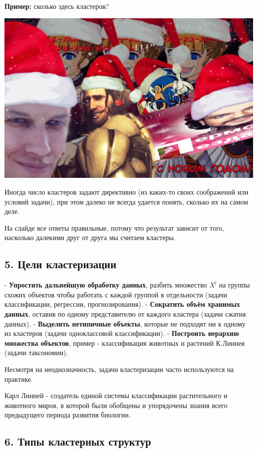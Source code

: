 \textbf{Пример:} сколько здесь кластеров?

\includegraphics[scale=0.3]{figures/samplefigure.jpg}

Иногда число кластеров задают директивно (из каких-то своих соображений
или условий задачи), при этом далеко не всегда удается понять, сколько
их на самом деле.

На слайде все ответы правильные, потому что результат зависит от того,
насколько далекими друг от друга мы считаем кластеры.

\subsection{5. Цели кластеризации}

- \textbf{Упростить дальнейшую обработку данных}, разбить множество $X^l$ на
группы схожих объектов чтобы работать с каждой группой в отдельности
(задачи классификации, регрессии, прогнозирования).
- \textbf{Сократить объём хранимых данных}, оставив по одному представителю от
каждого кластера (задачи сжатия данных).
- \textbf{Выделить нетипичные объекты}, которые не подходят ни к одному из
кластеров (задачи одноклассовой классификации).
- \textbf{Построить иерархию множества объектов}, пример - классификация
животных и растений К.Линнея (задачи таксономии).

Несмотря на неоднозначность, задачи кластеризации часто используются на
практике.

Карл Линней - создатель единой системы классификации растительного и
животного миров, в которой были обобщены и упорядочены знания всего
предыдущего периода развития биологии.

\subsection{6. Типы кластерных структур}

